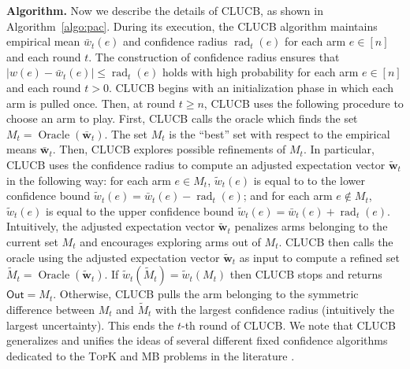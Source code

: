 \documentclass{article}
\newcommand{\wei}[1]{}
\newcommand{\wei}[1]{{\color{blue!50!black}  [\text{Wei:} #1]}}
\newcommand{\Algorithm}{{\small \textsf{CLUCB}}\xspace}
\DeclareMathOperator{\rad}{rad}
\DeclareMathOperator{\Oracle}{Oracle}
\newcommand{\out}{\mathsf{Out}}
\newcommand{\MultiIdent}{\textsc{TopK}\xspace}
\newcommand{\MultiBandit}{\textsc{MB}\xspace}
\renewcommand{\vec}[1]{\boldsymbol{#1}}
\begin{document}
\textbf{Algorithm.} 
Now we describe the details of \Algorithm, as shown in Algorithm~\ref{algo:pac}.
%
During its execution, the \Algorithm algorithm maintains empirical mean $\bar w_t(e)$ and confidence radius $\rad_t(e)$ for each arm $e\in[n]$ and each round $t$.
The construction of confidence radius ensures that $|w(e)-\bar w_t(e)| \le \rad_t(e)$ holds with high probability for each arm $e \in [n]$ and each round $t>0$.
\Algorithm begins with an initialization phase in which each arm is pulled once.
Then, at round $t \ge n$, \Algorithm uses the following procedure to choose an arm to play. 
First, \Algorithm calls the oracle which finds the set $M_t=\Oracle(\vec {\bar w}_t)$. 
The set $M_t$ is the ``best'' set with respect to the empirical means $\vec {\bar w}_t$.
Then, \Algorithm explores possible refinements of $M_t$. 
In particular, \Algorithm uses the confidence radius to compute an adjusted expectation vector $\vec {\tilde w}_t$ in the following way: for each arm $e \in M_t$, $\tilde w_t(e)$ is equal to to the lower confidence bound $\tilde w_t(e) = \bar w_t(e)-\rad_t(e)$; and for each arm $e\not\in M_t$, $\tilde w_t(e)$ is equal to the upper confidence bound $\tilde w_t(e)=\bar w_t(e)+\rad_t(e)$.
Intuitively, the adjusted expectation vector $\vec {\tilde w}_t$ penalizes arms belonging to the current set $M_t$ and encourages exploring arms out of $M_t$.
\Algorithm then calls the oracle using the adjusted expectation vector $\vec {\tilde w}_t$ as input to compute a refined set $\tilde M_t = \Oracle(\vec {\tilde w}_t)$.
If $\tilde w_t(\tilde M_t) = \tilde w_t(M_t)$ then \Algorithm stops and returns $\out=M_t$.
Otherwise, \Algorithm pulls the arm belonging to the symmetric difference  between $M_t$ and $\tilde M_t$ with the largest confidence radius (intuitively the largest uncertainty).
This ends the $t$-th round of \Algorithm.
We note that \Algorithm generalizes and unifies the ideas of several different fixed confidence algorithms dedicated to the \MultiIdent and \MultiBandit problems in the literature \citep{kalyanakrishnan2012pac,gabillon2012best,kaufmann2013information}.
\end{document}
